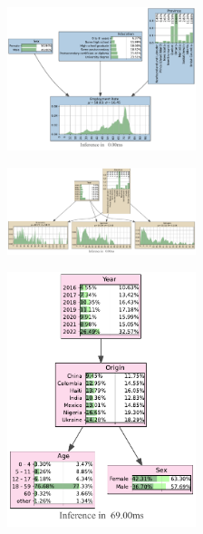 \documentclass[conference]{IEEEtran}
\begin{document}
	\begin{figure}[!htb]
		\begin{center}
			\includegraphics[clip, trim= 0 0 0 0, width=0.49\textwidth]{fig/bn_edu.pdf}
			\caption{}
			\label{fig:1}
		\end{center}
	\end{figure}
	
	\begin{figure}[!htb]
		\begin{center}
			\includegraphics[clip, trim= 0 0 0 0, width=0.49\textwidth]{fig/bn_pr.pdf}
			\caption{}
			\label{fig:2}
		\end{center}
	\end{figure}
	
	\begin{figure}[!htb]
		\begin{center}
			\includegraphics[clip, trim= 0 0 0 0, width=0.49\textwidth]{fig/credal_refugee.pdf}
			\caption{}
			\label{fig:3}
		\end{center}
	\end{figure}
	
\end{document}
